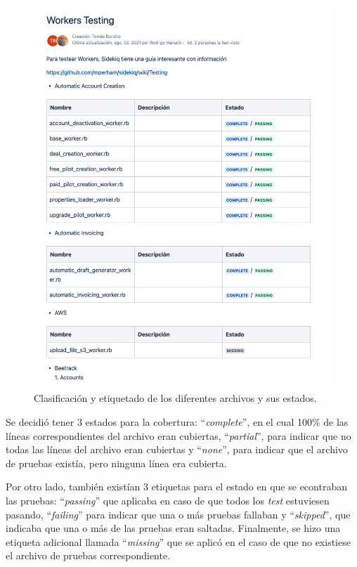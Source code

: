   \begin{figure}
    \centering
    \includegraphics[width=0.75\linewidth]{figures/testing/mapeo_tests_existentes.png}
    \caption{Clasificación y etiquetado de los diferentes archivos y sus estados.}
    \label{fig:mapeo_tests}
  \end{figure}

  Se decidió tener 3 estados para la cobertura: ``\textit{complete}'', en el cual 100\% de las líneas correspondientes del archivo eran cubiertas, ``\textit{partial}'', para indicar que no todas las líneas del archivo eran cubiertas y ``\textit{none}'', para indicar que el archivo de pruebas existía, pero ninguna línea era cubierta.
  
  Por otro lado, también existían 3 etiquetas para el estado en que se econtraban las pruebas: ``\textit{passing}'' que aplicaba en caso de que todos los \textit{test} estuviesen pasando, ``\textit{failing}'' para indicar que una o más pruebas fallaban y ``\textit{skipped}'', que indicaba que una o más de las pruebas eran saltadas. Finalmente, se hizo una etiqueta adicional llamada ``\textit{missing}'' que se aplicó en el caso de que no existiese el archivo de pruebas correspondiente.
  
